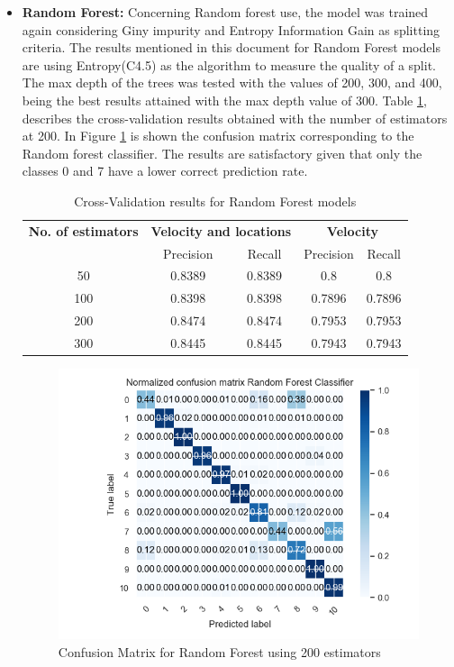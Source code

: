 \begin{itemize}
\newpage
\item \textbf{ Random Forest: }
Concerning Random forest use, the model was trained again considering Giny impurity and Entropy Information Gain as splitting criteria. 
The results mentioned in this document for Random Forest models are using Entropy(C4.5) as the algorithm to measure the quality of a split. The max depth of the trees was tested with the values of 200, 300, and 400, being the best results attained with the max depth value of 300. Table \ref{table:cross_val_rf}, describes the cross-validation results obtained with the number of estimators at 200. 
In Figure \ref{table:cross_val_rf} is shown the confusion matrix corresponding to the Random forest classifier. The results are satisfactory given that only the classes 0 and 7 have a lower correct prediction rate.

\begin {table}[H]
\caption {Cross-Validation results for Random Forest models}
\begin{center}
\begin{tabular}{c|c|c|c|c}
\multicolumn{1}{c|}{\textbf{No. of estimators } } &\multicolumn{2}{c|}{\textbf{ Velocity and locations}}& \multicolumn{2}{c}{\textbf{ Velocity}}\\
&Precision & Recall & Precision & Recall \\
\hline
50 &0.8389&0.8389 &0.8 &0.8\\
100 &0.8398&0.8398 &0.7896 &0.7896\\
200 &0.8474&0.8474 &0.7953 &0.7953 \\
300 &0.8445&0.8445 &0.7943 &0.7943 
\label{table:cross_val_rf}
\end{tabular}
\end{center}
\end {table}


\begin{figure}[h]
\centering
\includegraphics[width=0.8\linewidth]{Chapters/img/CM_RF.png}
\caption{Confusion Matrix for Random Forest using 200 estimators}
\label{fig:cm_rf}
\end{figure}



\end{itemize}
